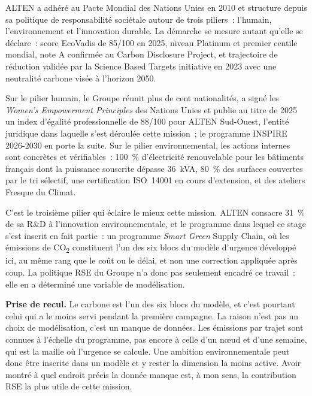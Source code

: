 \begin{frenchBox}
ALTEN a adh\'er\'e au Pacte Mondial des Nations Unies en 2010 et structure depuis sa politique
de responsabilit\'e soci\'etale autour de trois piliers~: l'humain, l'environnement et
l'innovation durable. La d\'emarche se mesure autant qu'elle se d\'eclare~: score EcoVadis de
85/100 en 2025, niveau Platinum et premier centile mondial, note A\textminus{} confirm\'ee au
Carbon Disclosure Project, et trajectoire de r\'eduction valid\'ee par la Science Based Targets
initiative en 2023 avec une neutralit\'e carbone vis\'ee \`a l'horizon 2050.

Sur le pilier humain, le Groupe r\'eunit plus de cent nationalit\'es, a sign\'e les
\emph{Women's Empowerment Principles} des Nations Unies et publie au titre de 2025 un index
d'\'egalit\'e professionnelle de 88/100 pour ALTEN Sud-Ouest, l'entit\'e juridique dans
laquelle s'est d\'eroul\'ee cette mission~; le programme INSPIRE 2026-2030 en porte la suite.
Sur le pilier environnemental, les actions internes sont concr\`etes et v\'erifiables~:
100~\% d'\'electricit\'e renouvelable pour les b\^atiments fran\c{c}ais dont la puissance
souscrite d\'epasse 36~kVA, 80~\% des surfaces couvertes par le tri s\'electif, une
certification ISO~14001 en cours d'extension, et des ateliers Fresque du Climat.

C'est le troisi\`eme pilier qui \'eclaire le mieux cette mission. ALTEN consacre 31~\% de sa
R\&D \`a l'innovation environnementale, et le programme dans lequel ce stage s'est inscrit en
fait partie~: un programme \emph{Smart Green} Supply Chain, o\`u les \'emissions de
CO\textsubscript{2} constituent l'un des six blocs du mod\`ele d'urgence d\'evelopp\'e ici, au
m\^eme rang que le co\^ut ou le d\'elai, et non une correction appliqu\'ee apr\`es coup. La
politique RSE du Groupe n'a donc pas seulement encadr\'e ce travail~: elle en a d\'etermin\'e
une variable de mod\'elisation.

\medskip

\noindent\textbf{Prise de recul.} Le carbone est l'un des six blocs du mod\`ele, et c'est
pourtant celui qui a le moins servi pendant la premi\`ere campagne. La raison n'est pas un
choix de mod\'elisation, c'est un manque de donn\'ees. Les \'emissions par trajet sont
connues \`a l'\'echelle du programme, pas encore \`a celle d'un n\oe{}ud et d'une semaine,
qui est la maille o\`u l'urgence se calcule. Une ambition environnementale peut donc \^etre
inscrite dans un mod\`ele et y rester la dimension la moins active. Avoir montr\'e \`a quel
endroit pr\'ecis la donn\'ee manque est, \`a mon sens, la contribution RSE la plus utile de
cette mission.
\end{frenchBox}
